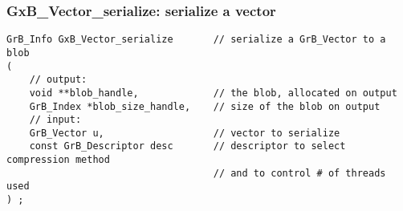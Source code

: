 \documentclass[12pt]{article}
\begin{document}

%

\subsubsection{{\sf GxB\_Vector\_serialize:}      serialize a vector}
\label{vector_serialize_GxB}

\begin{mdframed}[userdefinedwidth=6in]
{\footnotesize
\begin{verbatim}
GrB_Info GxB_Vector_serialize       // serialize a GrB_Vector to a blob
(
    // output:
    void **blob_handle,             // the blob, allocated on output
    GrB_Index *blob_size_handle,    // size of the blob on output
    // input:
    GrB_Vector u,                   // vector to serialize
    const GrB_Descriptor desc       // descriptor to select compression method
                                    // and to control # of threads used
) ;
\end{verbatim}
} \end{mdframed}
\end{document}
